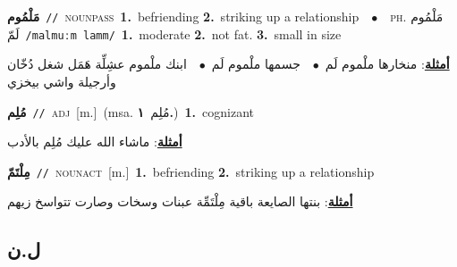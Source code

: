 \documentclass[10pt,a4paper,twoside]{article} %
\begin{document}
\begin{multicols}{2}
{\setlength\topsep{0pt}\textbf{\foreignlanguage{arabic}{مَلْمُوم}}\ {\color{gray}\texttt{//}\color{black}}\ \textsc{noun\textunderscore pass}\ \textbf{1.}~befriending  \textbf{2.}~striking up a relationship\ \ $\bullet$\ \ \textsc{ph.} \color{gray} \foreignlanguage{arabic}{مَلْمُوم لَمّ}\color{black}\ {\color{gray}\texttt{/{\sffamily malmuːm lamm}/}\color{black}}\ \textbf{1.}~moderate  \textbf{2.}~not fat.  \textbf{3.}~small in size\  \begin{flushright}\color{gray}\foreignlanguage{arabic}{\textbf{\underline{\foreignlanguage{arabic}{أمثلة}}}: منخارها ملْموم لَم\ $\bullet$\ \  جسمها ملْموم لَم\ $\bullet$\ \  ابنك ملْموم عشِلِّة هَمَل شغل دُخّان وأرجيلة واشي بيخزي}\end{flushright}\color{black}} \vspace{2mm}

{\setlength\topsep{0pt}\textbf{\foreignlanguage{arabic}{مُلِم}}\ {\color{gray}\texttt{//}\color{black}}\ \textsc{adj}\ [m.]\ \color{gray}(msa. \foreignlanguage{arabic}{مُلِم}~\foreignlanguage{arabic}{\textbf{١.}})\color{black}\ \textbf{1.}~cognizant\  \begin{flushright}\color{gray}\foreignlanguage{arabic}{\textbf{\underline{\foreignlanguage{arabic}{أمثلة}}}: ماشاء الله عليك مُلِم بالأدب}\end{flushright}\color{black}} \vspace{2mm}

{\setlength\topsep{0pt}\textbf{\foreignlanguage{arabic}{مِلْتَمّ}}\ {\color{gray}\texttt{//}\color{black}}\ \textsc{noun\textunderscore act}\ [m.]\ \textbf{1.}~befriending  \textbf{2.}~striking up a relationship\  \begin{flushright}\color{gray}\foreignlanguage{arabic}{\textbf{\underline{\foreignlanguage{arabic}{أمثلة}}}: بنتها الصايعة باقية مِلْتَمِّة عبنات وسخات وصارت تتواسخ زيهم}\end{flushright}\color{black}} \vspace{2mm}

\vspace{-3mm}
\subsection*{\color{blue}\foreignlanguage{arabic}{ل.ن}\color{blue}{}} 


\end{multicols}
\end{document}
